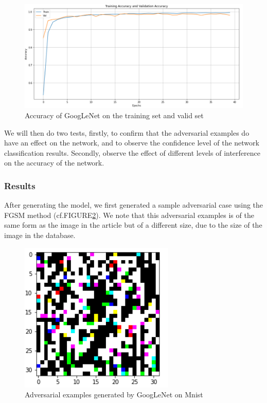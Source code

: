 \FloatBarrier
\begin{figure}[htbp]%
        \centering
        \includegraphics[scale=0.25]{GLNtrainingAcc.PNG}%
        \caption{ Accuracy of GoogLeNet on the training set and valid set}
        \label{GLN}
\end{figure}\par
\FloatBarrier

We will then do two tests, firstly, to confirm that the adversarial examples do have an effect on the network, and to observe the confidence level of the network classification results. Secondly, observe the effect of different levels of interference on the accuracy of the network.
\subsubsection{Results}
After generating the model, we first generated a sample adversarial case using the FGSM method (cf.FIGURE\ref{adv_exp}). We note that this adversarial examples is of the same form as the image in the article but of a different size, due to the size of the image in the database.
\FloatBarrier
\begin{figure}[htbp]
        \centering
        \includegraphics[scale=0.25]{adv_exp.PNG}%
        \caption{Adversarial examples generated by GoogLeNet on Mnist}
        \label{adv_exp}
\end{figure}\par
\FloatBarrier

